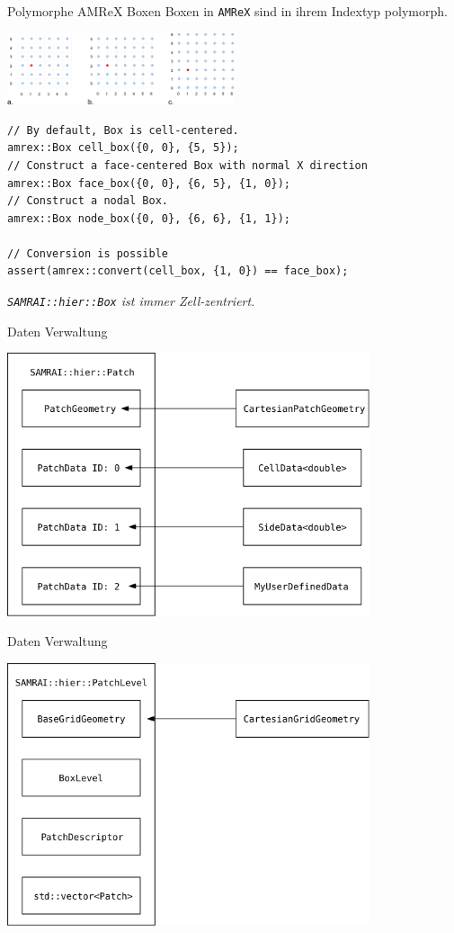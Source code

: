 \documentclass[ucs,9pt]{beamer}
\begin{document}
\begin{frame}[fragile]{Polymorphe AMReX Boxen}
Boxen in \texttt{AMReX} sind in ihrem Indextyp polymorph.
\begin{center}
\includegraphics[width=0.5\textwidth]{indextypes}
\end{center}
\begin{lstlisting}
// By default, Box is cell-centered.
amrex::Box cell_box({0, 0}, {5, 5});
// Construct a face-centered Box with normal X direction 
amrex::Box face_box({0, 0}, {6, 5}, {1, 0});
// Construct a nodal Box.
amrex::Box node_box({0, 0}, {6, 6}, {1, 1});

// Conversion is possible
assert(amrex::convert(cell_box, {1, 0}) == face_box);
\end{lstlisting}
\pause
\vspace{0.4cm}
\emph{\texttt{SAMRAI::hier::Box} ist immer Zell-zentriert.}
\end{frame}

\begin{frame}{Daten Verwaltung}
\begin{center}
\includegraphics[width=0.8\textwidth]{patch}
\end{center}
\end{frame}

\begin{frame}{Daten Verwaltung}
\begin{center}
\includegraphics[width=0.8\textwidth]{patch_level}
\end{center}
\end{frame}
\end{document}
